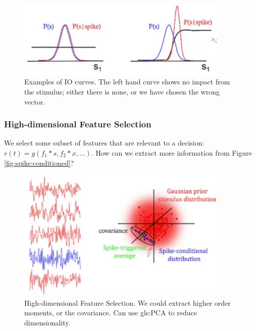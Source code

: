 \documentclass[]{article}
\begin{document}
\begin{figure}[H]
	\caption[Examples of IO curves]{Examples of IO curves. The left hand curve shows no impact from the stimulus; either there is none, or we have chosen the wrong vector.}\label{fig:sample-io-curves}
	\includegraphics[width=0.9\textwidth]{sample-io-curves}
\end{figure}

\subsubsection{High-dimensional Feature Selection}

We select some subset of features that are relevant to a decision: $r(t)=g(f_1*s, f_2*x,...)$. How can we extract more information from Figure \ref{fig:spike:conditioned}?

\begin{figure}[H]
	\caption[High-dimensional Feature Selection]{High-dimensional Feature Selection. We could extract higher order moments, or the covariance. Can use \gls{gls:PCA} to reduce dimensionality.}
	\includegraphics[width=0.9\textwidth]{spike-conditioned-distribution-covariance}
\end{figure}
\end{document}
